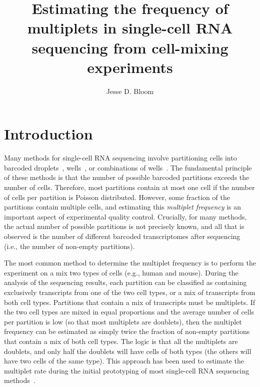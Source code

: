 \documentclass[fleqn,10pt,lineno]{wlpeerj} %
\title{Estimating the frequency of multiplets in single-cell RNA sequencing from cell-mixing experiments}
\author[1]{Jesse D. Bloom}
\affil[1]{Fred Hutch Cancer Research Center, Seattle, WA  98109}
\begin{document}
\flushbottom
\maketitle
\thispagestyle{empty}

\section*{Introduction}

Many methods for single-cell RNA sequencing involve partitioning cells into barcoded droplets~\citep{klein2015droplet,macosko2015highly,zheng2017massively}, wells~\citep{gierahn2017seq}, or combinations of wells~\citep{cao2017comprehensive}.
The fundamental principle of these methods is that the number of possible barcoded partitions exceeds the number of cells.
Therefore, most partitions contain at most one cell if the number of cells per partition is Poisson distributed.
However, some fraction of the partitions contain multiple cells, and estimating this \emph{multiplet frequency} is an important aspect of experimental quality control.
Crucially, for many methods, the actual number of possible partitions is not precisely known, and all that is observed is the number of different barcoded transcriptomes after sequencing (i.e., the number of non-empty partitions).

The most common method to determine the multiplet frequency is to perform the experiment on a mix two types of cells (e.g., human and mouse).
During the analysis of the sequencing results, each partition can be classified as containing exclusively transcripts from one of the two cell types, or a mix of transcripts from both cell types.
Partitions that contain a mix of transcripts must be multiplets.
If the two cell types are mixed in equal proportions and the average number of cells per partition is low (so that most multiplets are doublets), then the multiplet frequency can be estimated as simply twice the fraction of non-empty partitions that contain a mix of both cell types.
The logic is that all the multiplets are doublets, and only half the doublets will have cells of both types (the others will have two cells of the same type).
This approach has been used to estimate the multiplet rate during the initial prototyping of most single-cell RNA sequencing methods~\citep{klein2015droplet,macosko2015highly,zheng2017massively,gierahn2017seq,cao2017comprehensive}.
\end{document}
